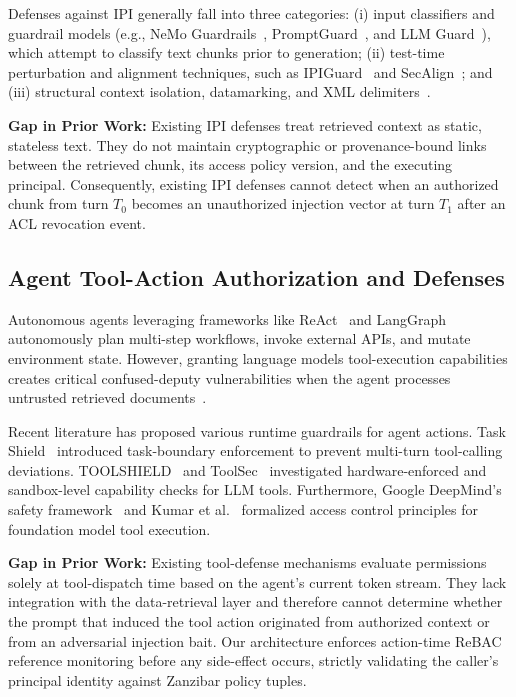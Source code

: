 Defenses against IPI generally fall into three categories: (i) input classifiers and guardrail models (e.g., NeMo Guardrails~\cite{rebedea2023nemo}, PromptGuard~\cite{promptguard2024}, and LLM Guard~\cite{llmguard2024}), which attempt to classify text chunks prior to generation; (ii) test-time perturbation and alignment techniques, such as IPIGuard~\cite{ipiguard2025} and SecAlign~\cite{secalign2025ccs}; and (iii) structural context isolation, datamarking, and XML delimiters~\cite{melon2025icml, drift2025, spring2025acl}.

\noindent\textbf{Gap in Prior Work:} Existing IPI defenses treat retrieved context as static, stateless text. They do not maintain cryptographic or provenance-bound links between the retrieved chunk, its access policy version, and the executing principal. Consequently, existing IPI defenses cannot detect when an authorized chunk from turn $T_0$ becomes an unauthorized injection vector at turn $T_1$ after an ACL revocation event.

\subsection{Agent Tool-Action Authorization and Defenses}
\label{sec:rel_tools}

Autonomous agents leveraging frameworks like ReAct~\cite{yao2023react} and LangGraph~\cite{langgraph2024} autonomously plan multi-step workflows, invoke external APIs, and mutate environment state. However, granting language models tool-execution capabilities creates critical confused-deputy vulnerabilities when the agent processes untrusted retrieved documents~\cite{agentpoison2024, toolattack2025}.

Recent literature has proposed various runtime guardrails for agent actions. Task Shield~\cite{taskshield2025acl} introduced task-boundary enforcement to prevent multi-turn tool-calling deviations. TOOLSHIELD~\cite{toolshield2025} and ToolSec~\cite{toolsec2025} investigated hardware-enforced and sandbox-level capability checks for LLM tools. Furthermore, Google DeepMind's safety framework~\cite{deepmindagents2025} and Kumar et al.~\cite{toolsafety2025} formalized access control principles for foundation model tool execution.

\noindent\textbf{Gap in Prior Work:} Existing tool-defense mechanisms evaluate permissions solely at tool-dispatch time based on the agent's current token stream. They lack integration with the data-retrieval layer and therefore cannot determine whether the prompt that induced the tool action originated from authorized context or from an adversarial injection bait. Our architecture enforces action-time ReBAC reference monitoring before any side-effect occurs, strictly validating the caller's principal identity against Zanzibar policy tuples.

